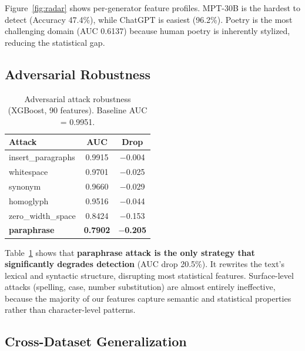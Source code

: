 \documentclass[sigconf,nonacm]{acmart}
\begin{document}
Figure~\ref{fig:radar} shows per-generator feature profiles. MPT-30B is the hardest to detect (Accuracy 47.4\%), while ChatGPT is easiest (96.2\%). Poetry is the most challenging domain (AUC 0.6137) because human poetry is inherently stylized, reducing the statistical gap.

\subsection{Adversarial Robustness}

\begin{table}[t]
\caption{Adversarial attack robustness (XGBoost, 90 features). Baseline AUC = 0.9951.}
\label{tab:adversarial}
\small
\begin{tabular}{lcc}
\toprule
\textbf{Attack} & \textbf{AUC} & \textbf{Drop} \\
\midrule
insert\_paragraphs       & 0.9915 & $-$0.004 \\
whitespace               & 0.9701 & $-$0.025 \\
synonym                  & 0.9660 & $-$0.029 \\
homoglyph                & 0.9516 & $-$0.044 \\
zero\_width\_space        & 0.8424 & $-$0.153 \\
\textbf{paraphrase}      & \textbf{0.7902} & \textbf{$-$0.205} \\
\bottomrule
\end{tabular}
\end{table}

Table~\ref{tab:adversarial} shows that \textbf{paraphrase attack is the only strategy that significantly degrades detection} (AUC drop 20.5\%). It rewrites the text's lexical and syntactic structure, disrupting most statistical features. Surface-level attacks (spelling, case, number substitution) are almost entirely ineffective, because the majority of our features capture semantic and statistical properties rather than character-level patterns.

\subsection{Cross-Dataset Generalization}
\end{document}
